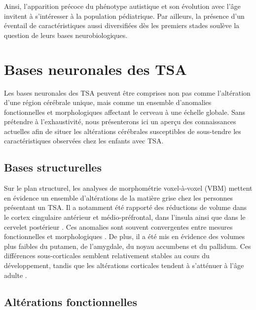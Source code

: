 \medskip

Ainsi, l'apparition précoce du phénotype autistique et son évolution avec l'âge invitent à s'intéresser à la population pédiatrique. Par ailleurs, la présence d'un éventail de caractéristiques aussi diversifiées dès les premiers stades soulève la question de leurs bases neurobiologiques.

\section{Bases neuronales des TSA} \label{sec:bases_neuro}

Les bases neuronales des TSA peuvent être comprises non pas comme l'altération d'une région cérébrale unique, mais comme un ensemble d'anomalies fonctionnelles et morphologiques affectant le cerveau à une échelle globale. Sans prétendre à l'exhaustivité, nous présenterons ici un aperçu des connaissances actuelles afin de situer les altérations cérébrales susceptibles de sous-tendre les caractéristiques observées chez les enfants avec TSA.

\subsection{Bases structurelles} \label{sec:bases_struct}

Sur le plan structurel, les analyses de morphométrie voxel‐à‐voxel (VBM) mettent en évidence un ensemble d'altérations de la matière grise chez les personnes présentant un TSA. Il a notamment été rapporté des réductions de volume dans le cortex cingulaire antérieur et médio-préfrontal, dans l'insula ainsi que dans le cervelet postérieur \parencite{Guo2024Apr}. Ces anomalies sont souvent convergentes entre mesures fonctionnelles et morphologiques \parencite{Patriquin2016Oct}. De plus, il a été mis en évidence des volumes plus faibles du putamen, de l'amygdale, du noyau accumbens et du pallidum. Ces différences sous-corticales semblent relativement stables au cours du développement, tandis que les altérations corticales tendent à s'atténuer à l'âge adulte \parencite{vanRooij2017Nov}.

\subsection{Altérations fonctionnelles} \label{sec:alt_func}

